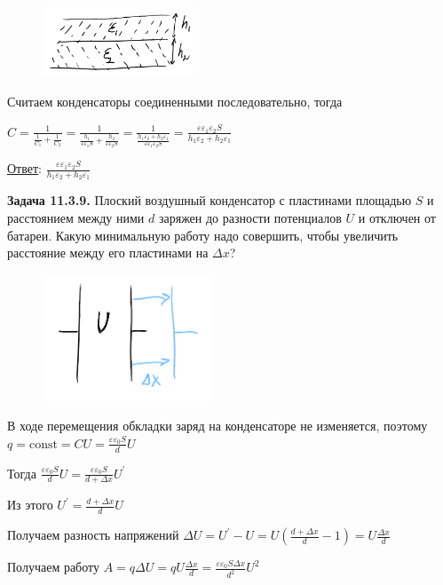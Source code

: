 \documentclass[12pt]{article}
\begin{document}
\begin{minipage}{\textwidth}
    \begin{figure}
        \includegraphics[width=0.4\textwidth]{physics1/images/physics1_homework_8_3}
    \end{figure}

    Считаем конденсаторы соединенными последовательно, тогда 

    $C = \frac{1}{\frac{1}{C_1} + \frac{1}{C_2}} = \frac{1}{\frac{h_1}{\varepsilon \varepsilon_1 S} + \frac{h_2}{\varepsilon \varepsilon_2 S}} = 
    \frac{1}{\frac{h_1 \varepsilon_2 + h_2 \varepsilon_1}{\varepsilon \varepsilon_1 \varepsilon_2 S}} = \frac{\varepsilon \varepsilon_1 \varepsilon_2 S}{h_1 \varepsilon_2 + h_2 \varepsilon_1}$
\end{minipage}

\bigvspace

\underline{Ответ}: $\frac{\varepsilon \varepsilon_1 \varepsilon_2 S}{h_1 \varepsilon_2 + h_2 \varepsilon_1}$

\begin{tcolorbox}
    \textbf{Задача 11.3.9.} Плоский воздушный конденсатор с пластинами
    площадью $S$ и расстоянием между ними $d$ заряжен до разности потенциалов $U$ и отключен от батареи. Какую минимальную работу
    надо совершить, чтобы увеличить расстояние между его пластинами на $\Delta x$?
\end{tcolorbox}


\begin{minipage}{\textwidth}
    \begin{figure}
        \includegraphics[width=5cm]{physics1/images/physics1_homework_8_4}
    \end{figure}

    В ходе перемещения обкладки заряд на конденсаторе не изменяется, поэтому $q = \mathrm{const} = CU = \frac{\varepsilon \varepsilon_0 S}{d} U$

    Тогда $\frac{\varepsilon \varepsilon_0 S}{d} U = \frac{\varepsilon \varepsilon_0 S}{d + \Delta x} U^{\prime}$

    Из этого $U^\prime = \frac{d + \Delta x}{d} U$

    Получаем разность напряжений $\Delta U = U^\prime - U = U\left(\frac{d + \Delta x}{d} - 1\right) = U \frac{\Delta x}{d}$

    Получаем работу $A = q \Delta U = q U \frac{\Delta x}{d} = \frac{\varepsilon \varepsilon_0 S \Delta x}{d^2} U^2$

\end{minipage}
\end{document}
